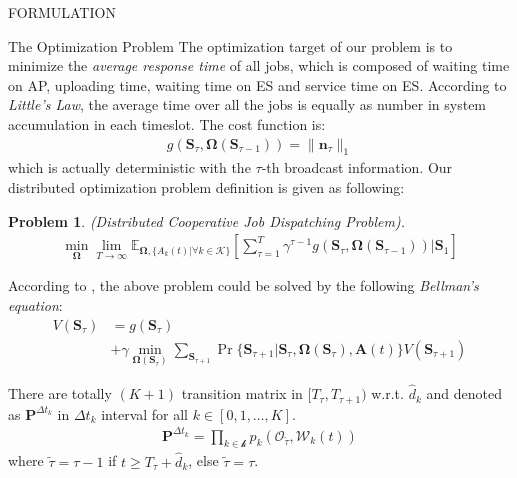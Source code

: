 \documentclass[10pt, conference, letterpaper]{IEEEtran}
\newtheorem{problem}{Problem}
\newcommand{\mat}{\mathbf}
\renewcommand{\vec}{\mathbf}
\newcommand{\apSet}{\mathcal{K}}
\newcommand{\wSet}{\mathcal{W}}
\newcommand{\Stat}{\mathbf{S}}
\newcommand{\Obsv}{\mathcal{O}}
\newcommand{\Policy}{\mathbf{\Omega}}
\begin{document}
\begin{section}{FORMULATION}
        \begin{subsection}{The Optimization Problem}
            The optimization target of our problem is to minimize the \emph{average response time} of all jobs, which is composed of waiting time on AP, uploading time, waiting time on ES and service time on ES. According to \emph{Little's Law}, the average time over all the jobs is equally as number in system accumulation in each timeslot. The cost function is:
            \begin{align}
                g(\Stat_\tau, \Policy(\Stat_{\tau-1})) = \|\vec{n}_\tau\|_{1}
            \end{align}
            which is actually deterministic with the $\tau$-th broadcast information.
            Our distributed optimization problem definition is given as following:
            \begin{problem}
                (Distributed Cooperative Job Dispatching Problem).
                \begin{gather}
                    \min_{\Policy} \lim_{T \to \infty}
                        \mathbb{E}_{\Policy, \{A_k(t)|\forall k\in\apSet\}}
                            [\sum_{\tau=1}^{T} \gamma^{\tau-1} g(\Stat_\tau, \Policy(\Stat_{\tau-1}))|\Stat_1]
                \end{gather}
            \end{problem}

            According to \cite{sutton1998introduction}, the above problem could be solved by the following \emph{Bellman's equation}:
            \begin{align}
                V(\Stat_{\tau}) &= g(\Stat_\tau)
                \nonumber\\
                &+\gamma \min_{\Policy(\Stat_\tau)} \sum_{\Stat_{\tau+1}} \Pr\{\Stat_{\tau+1}|\Stat_{\tau}, \Policy(\Stat_\tau), \vec{A}(t)\} V(\Stat_{\tau+1})
            \end{align}

            There are totally $(K+1)$ transition matrix in $[T_{\tau}, T_{\tau+1})$ w.r.t. $\hat{d}_k$ and denoted as $\mat{P}^{\Delta{t}_k}$ in $\Delta{t}_k$ interval for all $k\in[0,1,\dots,K]$.
            \begin{align}
                \mat{P}^{\Delta{t}_k} = \prod_{k\in\mathcal{k}} p_k(\Obsv_{\tilde{\tau}}, \wSet_k(t))
            \end{align}
            where $\tilde{\tau}=\tau-1$ if $t \geq T_\tau+\hat{d}_k$, else $\tilde{\tau}=\tau$.
        \end{subsection}
    \end{section}
\end{document}

